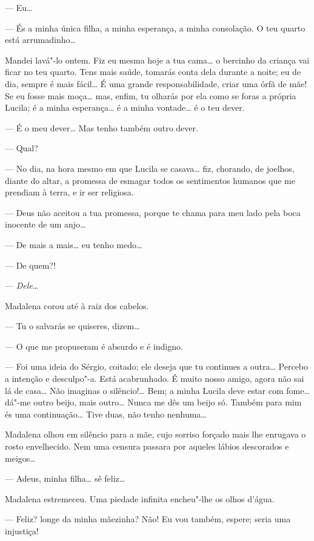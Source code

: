 --- Eu\ldots{}

--- És a minha única filha, a minha esperança, a minha consolação. O teu
quarto está arrumadinho\ldots{}

Mandei lavá"-lo ontem. Fiz eu mesma hoje a tua cama\ldots{} o bercinho da
criança vai ficar no teu quarto. Tens mais saúde, tomarás conta dela
durante a noite; eu de dia, sempre é mais fácil\ldots{} É uma grande
responsabilidade, criar uma órfã de mãe! Se eu fosse mais moça\ldots{} mas,
enfim, tu olharás por ela como se foras a própria Lucila; é a minha
esperança\ldots{} é a minha vontade\ldots{} é o teu dever.

--- É o meu dever\ldots{} Mas tenho também outro dever.

--- Qual?

--- No dia, na hora mesmo em que Lucila se casava\ldots{} fiz, chorando, de
joelhos, diante do altar, a promessa de esmagar todos os sentimentos
humanos que me prendiam à terra, e ir ser religiosa.

--- Deus não aceitou a tua promessa, porque te chama para meu lado pela
boca inocente de um anjo\ldots{}

--- De mais a mais\ldots{} eu tenho medo\ldots{}

--- De quem?!

--- \emph{Dele}\ldots{}

Madalena corou até à raiz dos cabelos.

--- Tu o salvarás se quiseres, dizem\ldots{}

--- O que me propuseram é absurdo e é indigno.

--- Foi uma ideia do Sérgio, coitado; ele deseja que tu continues a
outra\ldots{} Percebo a intenção e desculpo"-a. Está acabrunhado. É muito
nosso amigo, agora não sai lá de casa\ldots{} Não imaginas o silêncio!\ldots{}
Bem; a minha Lucila deve estar com fome\ldots{} dá"-me outro beijo, mais
outro\ldots{} Nunca me dês um beijo só. Também para mim és uma continuação\ldots{}
Tive duas, não tenho nenhuma\ldots{}

Madalena olhou em silêncio para a mãe, cujo sorriso forçado mais lhe
enrugava o rosto envelhecido. Nem uma censura passara por aqueles lábios
descorados e meigos\ldots{}

--- Adeus, minha filha\ldots{} sê feliz\ldots{}

Madalena estremeceu. Uma piedade infinita encheu"-lhe os olhos d'água.

--- Feliz? longe da minha mãezinha? Não! Eu vou também, espere; seria
uma injustiça!

